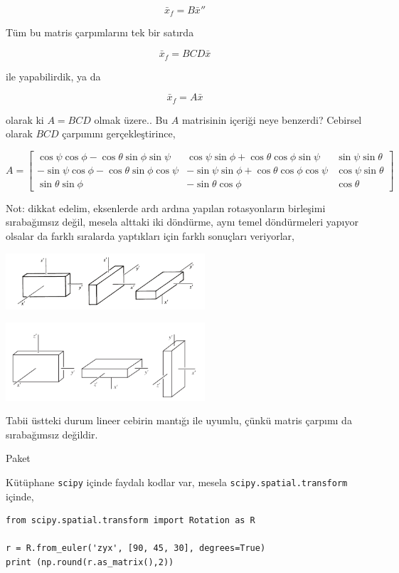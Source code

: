 \documentclass[12pt,fleqn]{article}\usepackage{../../common}
\begin{document}
$$
\bar{x}_f = B \bar{x}''
$$

Tüm bu matris çarpımlarını tek bir satırda

$$
\bar{x}_f =  B C D \bar{x}
$$

ile yapabilirdik, ya da

$$
\bar{x}_f =  A \bar{x}
$$

olarak ki $A = BCD$ olmak üzere.. Bu $A$ matrisinin içeriği neye benzerdi? Cebirsel
olarak $BCD$ çarpımını gerçekleştirince,

$$
A = \left[\begin{array}{ccc}
\cos\psi\cos\phi-\cos\theta\sin\phi\sin\psi &
\cos\psi\sin\phi + \cos\theta\cos\phi\sin\psi &
\sin\psi\sin\theta \\
-\sin\psi\cos\phi-\cos\theta\sin\phi\cos\psi &
-\sin\psi\sin\phi + \cos\theta\cos\phi\cos\psi &
\cos\psi\sin\theta \\
\sin\theta \sin\phi &
-\sin\theta\cos\phi &
\cos\theta
\end{array}\right]
$$

Not: dikkat edelim, eksenlerde ardı ardına yapılan rotasyonların birleşimi
sırabağımsız değil, mesela alttaki iki döndürme, aynı temel döndürmeleri
yapıyor olsalar da farklı sıralarda yaptıkları için farklı sonuçları veriyorlar,

\includegraphics[width=20em]{phy_072_rot_01.png}

\includegraphics[width=20em]{phy_072_rot_02.png}

Tabii üstteki durum lineer cebirin mantığı ile uyumlu, çünkü matris çarpımı da
sırabağımsız değildir.

Paket

Kütüphane \verb!scipy! içinde faydalı kodlar var, mesela \verb!scipy.spatial.transform!
içinde,

\begin{verbatim}
from scipy.spatial.transform import Rotation as R

r = R.from_euler('zyx', [90, 45, 30], degrees=True)
print (np.round(r.as_matrix(),2))
\end{verbatim}
\end{document}
